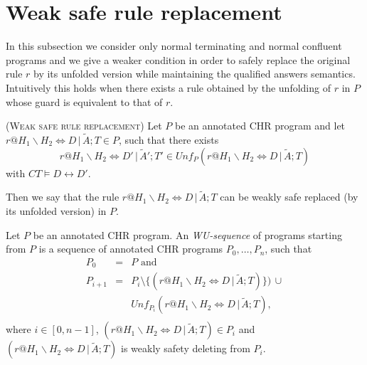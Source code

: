 \documentclass[final]{acmtrans2e}
\begin{document}
\noindent{$\Box$}


\section{Weak safe rule replacement}
In this subsection we consider only normal terminating and normal confluent programs and we give a weaker condition in order to safely replace the original rule $r$ by its unfolded version while maintaining the qualified answers semantics. Intuitively this holds when there exists a rule obtained by the unfolding of $r$ in $P$ whose guard is equivalent to that of $r$.

\begin{definition}\textsc{(Weak safe rule replacement)}\label{def:wsafedel}
Let $P$ be an annotated CHR program and let $r@H_1\backslash H_2
\Leftrightarrow  D\,|\,\tilde A; T \in P$, such that there exists
$$r@ H_1\backslash H_2 \Leftrightarrow D'\, |\, \tilde A'; T' \in
   Unf_P (r@H_1\backslash H_2 \Leftrightarrow D\,|\,\tilde A; T)$$
with $CT \models D \leftrightarrow D'$.


Then we say that the rule $r@H_1\backslash H_2 \Leftrightarrow  D\,|\,\tilde A; T $
can be weakly safe replaced (by its unfolded version) in $P$.
\end{definition}

\begin{definition}[WU-sequence]\label{def:wuno}
Let $P$ be an annotated CHR program. An \emph{WU-sequence} of programs
starting from $P$ is a sequence of annotated CHR programs $P_0, \ldots,
P_n$, such that
\[
\begin{array}{lll}
  P_0 & = & P  \mbox{ and }\\
  P_{i+1}& = &  P_i \setminus   \{(r@H_1\backslash H_2 \Leftrightarrow D\,|\,\tilde A; T)\} ) \, \cup\\
  &  & Unf_{P_i}(r@H_1\backslash H_2 \Leftrightarrow D\,|\,\tilde A; T), \\
\end{array}
 \]
 where $i \in [0,n-1]$, $(r@H_1\backslash H_2 \Leftrightarrow D\,|\,\tilde A;
 T)\in P_i$ and $(r@H_1\backslash H_2 \Leftrightarrow D\,|\,\tilde A;
 T)$  is
weakly safety deleting from $P_i$.
\end{definition}
\end{document}
